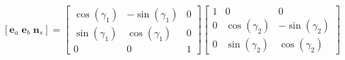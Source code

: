 $$
\left[\mathbf e_a\;\mathbf e_b\;\mathbf n_s\right] = \left[\begin{matrix}\cos{\left(\gamma_1 \right)} & - \sin{\left(\gamma_1 \right)} & 0\\\sin{\left(\gamma_1 \right)} & \cos{\left(\gamma_1 \right)} & 0\\0 & 0 & 1\end{matrix}\right] \left[\begin{matrix}1 & 0 & 0\\0 & \cos{\left(\gamma_2 \right)} & - \sin{\left(\gamma_2 \right)}\\0 & \sin{\left(\gamma_2 \right)} & \cos{\left(\gamma_2 \right)}\end{matrix}\right]
$$
